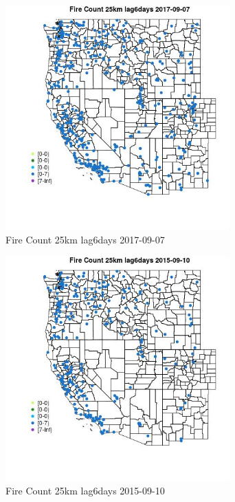 \begin{figure} 
\centering  
\includegraphics[width=0.77\textwidth]{Code_Outputs/Report_ML_input_PM25_Step4_part_e_de_duplicated_aves_compiled_2019-05-20wNAs_MapObsFire_Count_25km_lag6days2017-09-07.jpg} 
\caption{\label{fig:Report_ML_input_PM25_Step4_part_e_de_duplicated_aves_compiled_2019-05-20wNAsMapObsFire_Count_25km_lag6days2017-09-07}Fire Count 25km lag6days 2017-09-07} 
\end{figure} 
 

\begin{figure} 
\centering  
\includegraphics[width=0.77\textwidth]{Code_Outputs/Report_ML_input_PM25_Step4_part_e_de_duplicated_aves_compiled_2019-05-20wNAs_MapObsFire_Count_25km_lag6days2015-09-10.jpg} 
\caption{\label{fig:Report_ML_input_PM25_Step4_part_e_de_duplicated_aves_compiled_2019-05-20wNAsMapObsFire_Count_25km_lag6days2015-09-10}Fire Count 25km lag6days 2015-09-10} 
\end{figure} 
 

